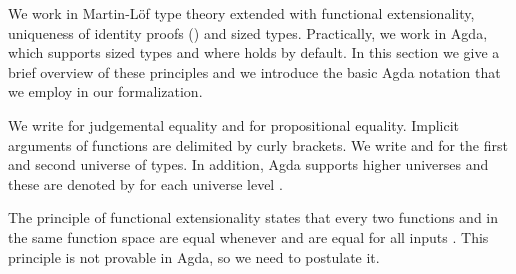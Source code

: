 
We work in Martin-L\"of type theory extended with functional
extensionality, uniqueness of identity proofs () and sized
types.  Practically, we work in Agda, which supports sized types and
where  holds by default. In this section we give a brief
overview of these principles and we introduce the basic Agda notation
that we employ in our formalization.

We write \Ar{=} for judgemental equality and  for propositional
equality. Implicit arguments of functions are delimited by curly
brackets. We write  and  for the first and second
universe of types. In addition, Agda supports higher universes and
these are denoted by   for each universe level .

The principle of functional extensionality states that every two
functions  and  in the same function space are
 equal whenever  and  are equal for all
inputs . This principle is not provable in Agda, so we need to
postulate it.
\begin{code}%
\>[0]\<%
\\
\>[0][@{}l@{\AgdaIndent{0}}]%
\>[2]\AgdaSpace{}%
\AgdaSymbol{:}\AgdaSpace{}%
\AgdaSymbol{\{}\AgdaSpace{}%
\AgdaSymbol{:}\AgdaSpace{}%
\AgdaSymbol{\}}\AgdaSpace{}%
\AgdaSymbol{\{}\AgdaSpace{}%
\AgdaSymbol{:}\AgdaSpace{}%
\AgdaSpace{}%
\AgdaSpace{}%
\AgdaSymbol{\}}\AgdaSpace{}%
\AgdaSymbol{\{}\AgdaSpace{}%
\AgdaSpace{}%
\AgdaSymbol{:}\AgdaSpace{}%
\AgdaSymbol{(}\AgdaSpace{}%
\AgdaSymbol{:}\AgdaSpace{}%
\AgdaSymbol{)}\AgdaSpace{}%
\AgdaSpace{}%
\AgdaSpace{}%
\AgdaSymbol{\}}\AgdaSpace{}%
\AgdaSpace{}%
\AgdaSymbol{((}\AgdaSpace{}%
\AgdaSymbol{:}\AgdaSpace{}%
\AgdaSymbol{)}\AgdaSpace{}%
\AgdaSpace{}%
\AgdaSpace{}%
\AgdaSpace{}%
\AgdaSpace{}%
\AgdaSpace{}%
\AgdaSymbol{)}\AgdaSpace{}%
\AgdaSpace{}%
\AgdaSpace{}%
\AgdaSpace{}%
\<%
\end{code}

